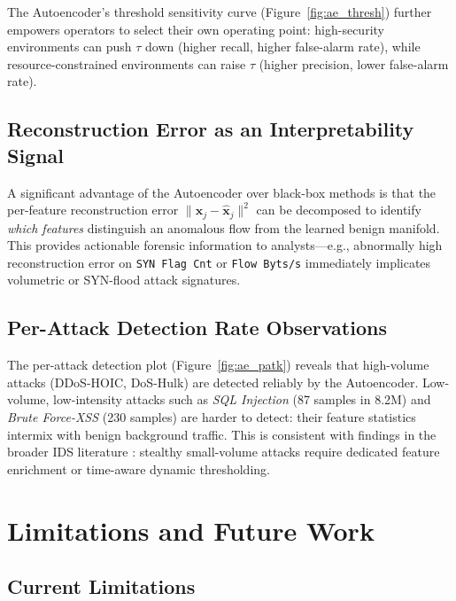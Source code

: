 \documentclass[10pt,conference]{IEEEtran}
\begin{document}
The Autoencoder's threshold sensitivity curve (Figure~\ref{fig:ae_thresh})
further empowers operators to select their own operating point:
high-security environments can push $\tau$ down (higher recall,
higher false-alarm rate), while resource-constrained environments
can raise $\tau$ (higher precision, lower false-alarm rate).

\subsection{Reconstruction Error as an Interpretability Signal}

A significant advantage of the Autoencoder over black-box methods is
that the per-feature reconstruction error $\|\mathbf{x}_j - \hat{\mathbf{x}}_j\|^2$
can be decomposed to identify \emph{which features} distinguish an
anomalous flow from the learned benign manifold. This provides actionable
forensic information to analysts—e.g., abnormally high reconstruction
error on \texttt{SYN~Flag~Cnt} or \texttt{Flow~Byts/s} immediately
implicates volumetric or SYN-flood attack signatures.

\subsection{Per-Attack Detection Rate Observations}

The per-attack detection plot (Figure~\ref{fig:ae_patk}) reveals that
high-volume attacks (DDoS-HOIC, DoS-Hulk) are detected reliably by the
Autoencoder. Low-volume, low-intensity attacks such as \emph{SQL
Injection} (87 samples in 8.2M) and \emph{Brute Force-XSS} (230
samples) are harder to detect: their feature statistics intermix with
benign background traffic. This is consistent with findings in the
broader IDS literature \cite{plosone2024, sensors2023}: stealthy
small-volume attacks require dedicated feature enrichment or
time-aware dynamic thresholding.

\section{Limitations and Future Work}
\label{sec:limits}

\subsection{Current Limitations}
\end{document}
